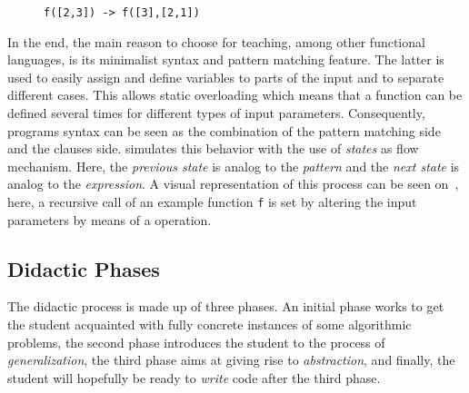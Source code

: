 \begin{figure}
  \centering
  \caption{\texttt{f([2,3]) -> f([3],[2,1])}}
  \label{fig:iface:states}
\end{figure}

In the end, the main reason to choose \erlang for teaching, among
other functional languages, is its minimalist syntax and pattern
matching feature. The latter is used to easily assign and define
variables to parts of the input and to separate different cases. This
allows static overloading which means that a function can be defined
several times for different types of input parameters. Consequently,
programs syntax can be seen as the combination of the pattern matching
side and the clauses side. \vestige simulates this behavior with the
use of \emph{states} as flow mechanism. Here, the \emph{previous state}
is analog to the \emph{pattern} and the \emph{next state} is analog to
the \emph{expression}. A visual representation of this process can be
seen on~, here, a recursive call of an example
function \texttt{f} is set by altering the input parameters by means
of a \poppush operation.

\subsection{Didactic Phases}

The didactic process is made up of three phases. An initial phase
works to get the student acquainted with fully concrete instances of
some algorithmic problems, the second phase introduces the student to
the process of \emph{generalization}, the third phase aims at giving
rise to \emph{abstraction}, and finally, the student will hopefully be
ready to \emph{write} \erlang code after the third phase.

